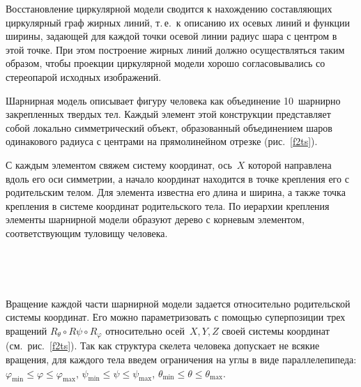 \begin{multicols}{2}
     Восстановление циркулярной модели сводится к нахождению 
составляющих циркулярный граф жирных линий, т.\,е.\ к описанию их осевых 
линий и функции ширины, задающей для каждой точки осевой линии радиус 
шара с центром в этой точке. При этом построение жирных линий должно 
осуществляться таким образом, чтобы проекции циркулярной модели хорошо 
согласовывались со стереопарой исходных изображений.
     
     Шарнирная модель описывает фигуру человека как объединение 
10~шарнирно закрепленных твердых тел. Каждый элемент этой конструкции 
представляет собой локально симметрический объект, образованный 
объединением шаров одинакового радиуса с центрами на прямолинейном 
отрезке (рис.~\ref{f2ts}). 
     
     С каждым элементом свяжем систему координат, ось~$X$ которой 
направлена вдоль его оси сим\-мет\-рии, а начало координат находится в точке 
крепления его с родительским телом. Для элемента известна его длина и 
ширина, а также точка крепления в системе координат родительского тела. По 
иерархии крепления элементы шарнирной модели образуют дерево с корневым 
элементом, соответствующим туловищу человека.
     
     \begin{figure*} %
     \vspace*{1pt}
\begin{center}
\mbox{%
\epsfxsize=130.894mm
}
\end{center}
\vspace*{-6pt}
\end{figure*}
\begin{figure*}[b] %
\vspace*{1pt}
\begin{center}
\mbox{%
\epsfxsize=152.966mm
}
\end{center}
\vspace*{-6pt}
\end{figure*}
     
     Вращение каждой части шарнирной модели задается относительно 
родительской системы координат. Его можно параметризовать с помощью 
суперпозиции трех вращений $R_\theta \circ R\psi \circ R_\varphi$ относительно 
осей~$X, Y, Z$ своей системы координат (см.\ рис.~\ref{f2ts}). Так как структура 
скелета человека допускает не всякие вращения, для каждого тела введем 
ограничения на углы в виде параллелепипеда: $\varphi_{\min}\leq \varphi \leq 
\varphi_{\max}$, $\psi_{\min}\leq \psi\leq \psi_{\max}$, 
$\theta_{\min}\leq\theta\leq \theta_{\max}$.
     

\end{multicols}
